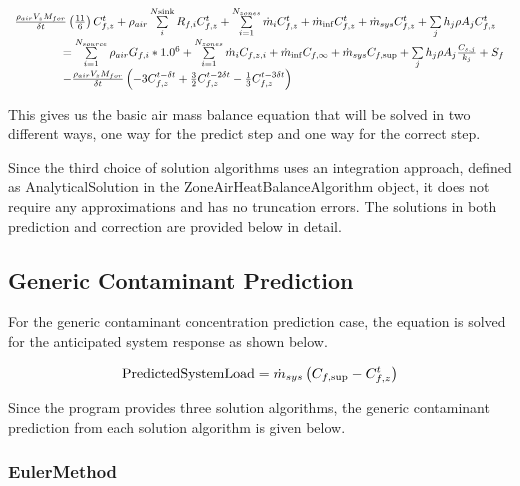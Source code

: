 \begin{equation}
\begin{array}{l}\frac{{{\rho_{air}}{V_z}{M_{for}}}}{{\delta t}}\left( {\frac{{11}}{6}} \right)C_{f,z}^t + {\rho_{air}}\sum\limits_i^{N{\rm{sink}}} {{R_{f,i}}C_{f,z}^t}  + \sum\limits_{i = 1}^{{N_{zones}}} {{{\dot m}_i}} C_{f,z}^t + {{\dot m}_{\inf }}C_{f,z}^t + {{\dot m}_{sys}}C_{f,z}^t + \sum\limits_j {{h_j}\rho {A_j}C_{f,z}^t} \\\;\;\;\;\;\;\;\;\;\;\;\;\;\;\; = \sum\limits_{i = 1}^{{N_{source}}} {{\rho_{air}}{G_{f,i}}*{{1.0}^6}}  + \sum\limits_{i = 1}^{{N_{zones}}} {{{\dot m}_i}} {C_{f,z,i}} + {{\dot m}_{\inf }}{C_{f,\infty }} + {{\dot m}_{sys}}{C_{f,\sup }} + \sum\limits_j {{h_j}\rho {A_j}\frac{{{C_{s,j}}}}{{{k_j}}}}  + {S_f}\\\;\;\;\;\;\;\;\;\;\;\;\;\;\;\; - \frac{{{\rho_{air}}{V_z}{M_{for}}}}{{\delta t}}\left( { - 3C_{f,z}^{t - \delta t} + \frac{3}{2}C_{f,z}^{t - 2\delta t} - \frac{1}{3}C_{f,z}^{t - 3\delta t}} \right)\end{array}
\end{equation}

This gives us the basic air mass balance equation that will be solved in two different ways, one way for the predict step and one way for the correct step.

Since the third choice of solution algorithms uses an integration approach, defined as AnalyticalSolution in the ZoneAirHeatBalanceAlgorithm object, it does not require any approximations and has no truncation errors. The solutions in both prediction and correction are provided below in detail.

\subsection{Generic Contaminant Prediction}\label{generic-contaminant-prediction}

For the generic contaminant concentration prediction case, the equation is solved for the anticipated system response as shown below.

\begin{equation}
{\rm{PredictedSystemLoad}} = {\dot m_{sys}}\left( {{C_{f,\sup }} - C_{f,z}^t} \right)
\end{equation}

Since the program provides three solution algorithms, the generic contaminant prediction from each solution algorithm is given below.

\subsubsection{EulerMethod}\label{eulermethod-000}

